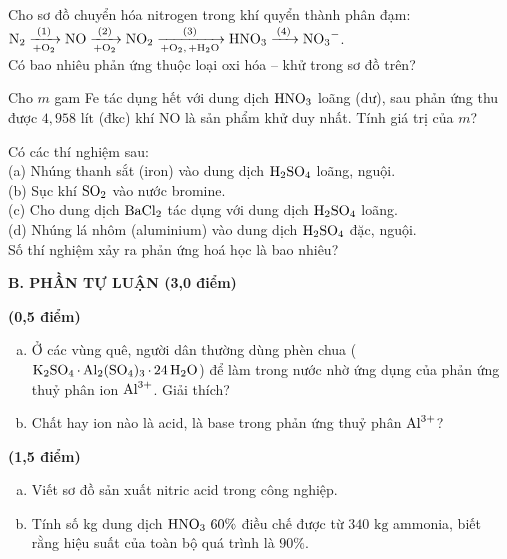 \documentclass[12pt,a4paper]{article}
\begin{document}
\begin{ex}
Cho sơ đồ chuyển hóa nitrogen trong khí quyển thành phân đạm:\\
$\ce{N2 ->[(1)][+O2] NO ->[(2)][+O2] NO2 ->[(3)][+O2, +H2O] HNO3 ->[(4)] NO3-}$.\\
Có bao nhiêu phản ứng thuộc loại oxi hóa -- khử trong sơ đồ trên?
\shortans{}
\loigiai{}
\end{ex}

\begin{ex}
Cho $m$ gam Fe tác dụng hết với dung dịch $\ce{HNO3}$ loãng (dư), sau phản ứng thu được $4{,}958\text{ lít}$ (đkc) khí NO là sản phẩm khử duy nhất. Tính giá trị của $m$?
\shortans{}
\loigiai{}
\end{ex}

\begin{ex}
Có các thí nghiệm sau:\\
(a) Nhúng thanh sắt (iron) vào dung dịch $\ce{H2SO4}$ loãng, nguội.\\
(b) Sục khí $\ce{SO2}$ vào nước bromine.\\
(c) Cho dung dịch $\ce{BaCl2}$ tác dụng với dung dịch $\ce{H2SO4}$ loãng.\\
(d) Nhúng lá nhôm (aluminium) vào dung dịch $\ce{H2SO4}$ đặc, nguội.\\
Số thí nghiệm xảy ra phản ứng hoá học là bao nhiêu?
\shortans{}
\loigiai{}
\end{ex}

\bigskip
\noindent
\textbf{\large B. PHẦN TỰ LUẬN (3,0 điểm)}

\begin{ex}
\textbf{(0,5 điểm)}
\begin{enumerate}[a)]
	\item Ở các vùng quê, người dân thường dùng phèn chua ($\ce{K2SO4.Al2(SO4)3.24H2O}$) để làm trong nước nhờ ứng dụng của phản ứng thuỷ phân ion $\ce{Al^3+}$. Giải thích?
	\item Chất hay ion nào là acid, là base trong phản ứng thuỷ phân $\ce{Al^3+}$?
\end{enumerate}
\loigiai{}
\vspace*{2.5cm}
\end{ex}

\begin{ex}
\textbf{(1,5 điểm)}
\begin{enumerate}[a)]
	\item Viết sơ đồ sản xuất nitric acid trong công nghiệp.
	\item Tính số kg dung dịch $\ce{HNO3}\ 60\%$ điều chế được từ $340\text{ kg}$ ammonia, biết rằng hiệu suất của toàn bộ quá trình là $90\%$.
\end{enumerate}
\loigiai{}
\vspace*{4.5cm}
\end{ex}
\end{document}
